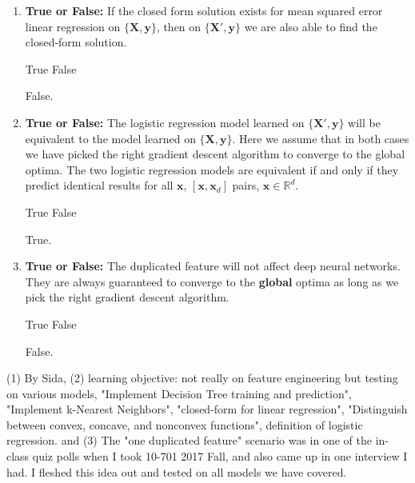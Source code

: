 \begin{questions}
\begin{enumerate} [label=(\roman*)]
\begin{checkboxes}
     \choice True 
     \choice False
    \end{checkboxes}
    \begin{soln}
    False.
    \end{soln}

\item \textbf{True or False:} If the closed form solution exists for mean squared error linear regression on $\{\mathbf{X}, \mathbf{y} \}$, then on $\{ \mathbf{X'}, \mathbf{y} \}$ we are also able to find the closed-form solution. 

\begin{checkboxes}
     \choice True 
     \choice False
    \end{checkboxes}
    \begin{soln}
    False.
    \end{soln}

\item \textbf{True or False:} The logistic regression model learned on $\{\mathbf{X'}, \mathbf{y} \}$ will be equivalent to the model learned on $\{ \mathbf{X}, \mathbf{y} \}$. Here we assume that in both cases we have picked the right gradient descent algorithm to converge to the global optima. The two logistic regression models are equivalent if and only if they predict identical results for all $\mathbf{x}$, $[\mathbf{x}, \mathbf{x}_d]$ pairs, $\mathbf{x} \in \mathbb{R}^d$.

\begin{checkboxes}
     \choice True 
     \choice False
    \end{checkboxes}
    \begin{soln}
    True.
    \end{soln}

\item \textbf{True or False:} The duplicated feature will not affect deep neural networks. They are always guaranteed to converge to the \textbf{global} optima as long as we pick the right gradient descent algorithm.

\begin{checkboxes}
     \choice True 
     \choice False
    \end{checkboxes}
    \begin{soln}
    False.
    \end{soln}

\end{enumerate}

\begin{qauthor}
    (1) By Sida, (2) learning objective: not really on feature engineering but testing on various models, "Implement Decision Tree training and prediction", "Implement k-Nearest Neighbors", "closed-form for linear regression", "Distinguish between convex, concave, and nonconvex functions", definition of logistic regression.  and (3) The "one duplicated feature" scenario was in one of the in-class quiz polls when I took 10-701 2017 Fall, and also came up in one interview I had. I fleshed this idea out and tested on all models we have covered.
\end{qauthor}


\end{questions}
